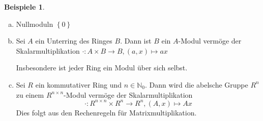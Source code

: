 \documentclass[
twoside=semi,
fontsize=12,
DIV=12, 
cleardoublepage=current,
leqno,
headings=optiontoheadandtoc, 
toc=idx
]{scrbook}
\newcommand{\N}{\mathbb{N}}
\newcommand{\set}[1]{\left\{ #1 \right\}}
\theoremstyle{definition}
\newtheorem{beispiele}[definition]{Beispiele}
\begin{document}
	\begin{beispiele}\label{1.1.3}
			\begin{enumerate}[(a)]
			\item Nullmoduln $\set{0}$
			
			\item Sei $A$ ein Unterring des Ringes $B$. Dann ist $B$ ein $A$-Modul verm\"oge der Skalarmultiplikation $\cdot: A \times B \to B, (a, x) \mapsto ax$
			
			Insbesondere ist jeder Ring ein Modul \"uber sich selbst.
			
			\item Sei $R$ ein kommutativer Ring und $n \in \N_0$. Dann wird die abelsche Gruppe $R^n$ zu einem $R^{n\times n}$-Modul verm\"oge der Skalarmultiplikation
			\[\cdot: R^{n\times n} \times R^n \to R^n, (A, x) \mapsto Ax\]
			Dies folgt aus den Rechenregeln f\"ur Matrixmultiplikation.
		\end{enumerate}
	\end{beispiele}
	
\end{document}
